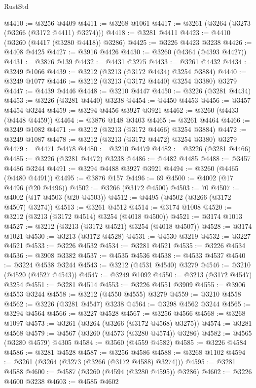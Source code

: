\begin{lexlean}{RustStd}
\begin{coremodule}
@4410 := @3256 @4409
@4411 := @3268 @1061
@4417 := @3261 (@3264 (@3273 (@3266 (@3172 @4411) @3274)))
@4418 := @3281 @4411
@4423 := @4410 (@3260 (@4417 (@3280 @4418)) @3286)
@4425 := @3226 @4423 @3238
@4426 := @4408 @4425
@4427 := @3916 @4426
@4430 := @3260 (@4364 (@4393 @4427))
@4431 := @3876 @139
@4432 := @4431 @3275
@4433 := @3261 @4432
@4434 := @3249 @1066
@4439 := @3212 (@3213 (@3172 @4434) @3254 @3884)
@4440 := @3249 @1077
@4446 := @3212 (@3213 (@3172 @4440) @3254 @3380) @3279
@4447 := @4439 @4446
@4448 := @3210 @4447
@4450 := @3226 (@3281 @4434)
@4453 := @3226 (@3281 @4440) @3238
@4454 := @4450 @4453
@4456 := @3457 @4454 @3244
@4459 := @3294 @4456 @3927 @3921
@4462 := @3260 (@4433 (@4448 @4459))
@4464 := @3876 @148 @3403
@4465 := @3261 @4464
@4466 := @3249 @1082
@4471 := @3212 (@3213 (@3172 @4466) @3254 @3884)
@4472 := @3249 @1087
@4478 := @3212 (@3213 (@3172 @4472) @3254 @3380) @3279
@4479 := @4471 @4478
@4480 := @3210 @4479
@4482 := @3226 (@3281 @4466)
@4485 := @3226 (@3281 @4472) @3238
@4486 := @4482 @4485
@4488 := @3457 @4486 @3244
@4491 := @3294 @4488 @3927 @3921
@4494 := @3260 (@4465 (@4480 @4491))
@4495 := @3876 @157
@4496 := 69
@4500 := @4002 (@17 @4496 (@20 @4496))
@4502 := @3266 (@3172 @4500)
@4503 := 70
@4507 := @4002 (@17 @4503 (@20 @4503))
@4512 := @4495 (@4502 (@3266 (@3172 @4507) @3274))
@4513 := @3261 @4512
@4514 := @3174 @1008
@4520 := @3212 (@3213 (@3172 @4514) @3254 (@4018 @4500))
@4521 := @3174 @1013
@4527 := @3212 (@3213 (@3172 @4521) @3254 (@4018 @4507))
@4528 := @3174 @1021
@4530 := @3213 (@3172 @4528)
@4531 := @4530 @3219
@4532 := @3227 @4521
@4533 := @3226 @4532
@4534 := @3281 @4521
@4535 := @3226 @4534
@4536 := @3908 @3382
@4537 := @4535 @4536
@4538 := @4533 @4537
@4540 := @3224 @4538 @3244
@4543 := @3212 (@4531 @4540) @3279
@4546 := @3210 (@4520 (@4527 @4543))
@4547 := @3249 @1092
@4550 := @3213 (@3172 @4547) @3254
@4551 := @3281 @4514
@4553 := @3226 @4551 @3909
@4555 := @3906 @4553 @3244
@4558 := @3212 (@4550 @4555) @3279
@4559 := @3210 @4558
@4562 := @3226 (@3281 @4547) @3238
@4564 := @3298 @4562 @3244
@4565 := @3294 @4564
@4566 := @3227 @4528
@4567 := @3256 @4566
@4568 := @3268 @1097
@4573 := @3261 (@3264 (@3266 (@3172 @4568) @3275))
@4574 := @3281 @4568
@4579 := @4567 (@3260 (@4573 (@3280 @4574)) @3286)
@4582 := @4565 (@3280 @4579) @4305
@4584 := @3560 (@4559 @4582)
@4585 := @3226 @4584
@4586 := @3281 @4528
@4587 := @3256 @4586
@4588 := @3268 @1102
@4594 := @3261 (@3264 (@3273 (@3266 (@3172 @4588) @3274)))
@4595 := @3281 @4588
@4600 := @4587 (@3260 (@4594 (@3280 @4595)) @3286)
@4602 := @3226 @4600 @3238
@4603 := @4585 @4602

\end{coremodule}
\end{lexlean}
